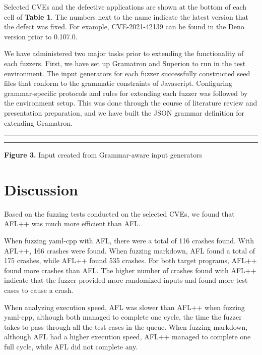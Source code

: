 \documentclass[12pt]{diazessay}
\begin{document}
Selected CVEs and the defective applications are shown at the bottom of each cell of \textbf{Table 1}. The numbers next to the name indicate the latest version that the defect was fixed. For example, CVE-2021-42139 can be found in the Deno version prior to 0.107.0.


We have administered two major tasks prior to extending the functionality of each fuzzers.
First, we have set up Gramatron and Superion to run in the test environment.
The input generators for each fuzzer successfully constructed seed files \cite{superion-example}\cite{gramatron-example}that conform to the grammatic constraints of Javascript.
Configuring grammar-specific protocols and rules for extending each fuzzer was followed by the environment setup.
This was done through the course of literature review and presentation preparation, and we have built the JSON grammar definition\cite{json-source.json} for extending Gramatron.

\vspace{12mm}
\hrule height 0.4mm
\begingroup \fontsize{12pt}{12pt} \selectfont \begin{alltt}

\end{alltt} \vspace{-6mm} \endgroup \hrule height 0.4mm
\vspace{6mm}
\centerline{\textbf{Figure 3.} Input created from Grammar-aware input generators}
\vspace{6mm}


\section*{Discussion}

Based on the fuzzing tests conducted on the selected CVEs, we found that AFL++ was much more efficient than AFL. 

When fuzzing yaml-cpp with AFL, there were a total of 116 crashes found. With AFL++, 166 crashes were found. When fuzzing markdown, AFL found a total of 175 crashes, while AFL++ found 535 crashes. For both target programs, AFL++ found more crashes than AFL. The higher number of crashes found with AFL++ indicate that the fuzzer provided more randomized inputs and found more test cases to cause a crash.

When analyzing execution speed, AFL was slower than AFL++ when fuzzing yaml-cpp, although both managed to complete one cycle, the time the fuzzer takes to pass through all the test cases in the queue. When fuzzing markdown, although AFL had a higher execution speed, AFL++ managed to complete one full cycle, while AFL did not complete any.
\end{document}
